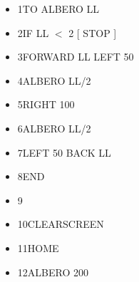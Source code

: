 \begin{minipage}{0.6\textwidth}
\begin{itemize}[itemsep=-3pt,parsep=2pt]
\item[] \hspace{0.5cm}  1\hspace{8pt}TO ALBERO LL           
\item[] \hspace{0.5cm}  2\hspace{8pt}\hspace{8pt}IF LL $<$ 2 [ STOP ]
\item[] \hspace{0.5cm}  3\hspace{8pt}\hspace{8pt}FORWARD LL LEFT 50
\item[] \hspace{0.5cm}  4\hspace{8pt}\hspace{8pt}ALBERO LL/2
\item[] \hspace{0.5cm}  5\hspace{8pt}\hspace{8pt}RIGHT 100 
\item[] \hspace{0.5cm}  6\hspace{8pt}\hspace{8pt}ALBERO LL/2
\item[] \hspace{0.5cm}  7\hspace{8pt}\hspace{8pt}LEFT 50 BACK LL
\item[] \hspace{0.5cm}  8\hspace{8pt}END
\item[] \hspace{0.5cm}  9\hspace{8pt}
\item[] \hspace{0.3cm} 10\hspace{8pt}CLEARSCREEN
\item[] \hspace{0.3cm} 11\hspace{8pt}HOME
\item[] \hspace{0.3cm} 12\hspace{8pt}ALBERO 200            
\end{itemize}
\end{minipage}                       

